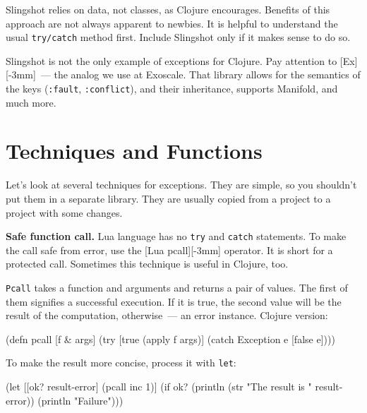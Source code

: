 Slingshot relies on data, not classes, as Clojure encourages. Benefits of this approach are not always apparent to newbies. It is helpful to understand the usual \verb|try/catch| method first. Include Slingshot only if it makes sense to do so.


Slingshot is not the only example of exceptions for Clojure. Pay attention to [Ex][-3mm]~--- the analog we use at Exoscale.
That library allows for the semantics of the keys (\verb|:fault|, \verb|:conflict|), and their inheritance, supports Manifold, and much more.

\section{ Techniques and Functions }

Let's look at several techniques for exceptions. They are simple, so you shouldn't put them in a separate library. They are usually copied from a project to a project with some changes.


\label{pcall}

\textbf{Safe function call.} Lua language has no \verb|try| and \verb|catch| statements. To make the call safe from error, use the [Lua pcall][-3mm] operator. It is short for a protected call. Sometimes this technique is useful in Clojure, too.

\verb|Pcall| takes a function and arguments and returns a pair of values. The first of them signifies a successful execution. If it is true, the second value will be the result of the computation, otherwise~--- an error instance. Clojure version:


\begin{clojure}
(defn pcall [f & args]
  (try
    [true (apply f args)]
    (catch Exception e [false e])))
\end{clojure}

To make the result more concise, process it with \verb|let|:

\ifx\DEVICETYPE\MOBILE

\begin{clojure}
(let [[ok? result-error] (pcall inc 1)]
  (if ok?
    (println
      (str "The result is "
        result-error))
    (println "Failure")))
\end{clojure}

